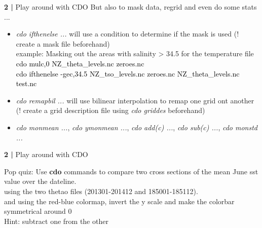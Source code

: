  \begin{frame}{\textbf{2 |} Play around with CDO} 
    But also to mask data, regrid and even do some stats ...\\
        \vspace{0.5cm}
    \begin{itemize}
        \item\textit{cdo ifthenelse ...} will use a condition to determine if the mask is used (! create a mask file beforehand) \\
                \vspace{0.3cm}
            example: Masking out the areas with salinity > 34.5 for the temperature file\\
                \vspace{0.3cm}
            \textcolor{black}{cdo mulc,0 NZ\_theta\_levels.nc zeroes.nc \\
            cdo ifthenelse -gec,34.5 NZ\_tso\_levels.nc zeroes.nc NZ\_theta\_levels.nc  test.nc}\\
                \vspace{0.5cm}
        \item\textit{cdo remapbil ...} will use bilinear interpolation to remap one grid ont another (! create a grid description file using \textit{cdo griddes} beforehand)\\
            \vspace{0.5cm}
        \item \textit{cdo monmean ...}, \textit{cdo ymonmean ...}, \textit{cdo add(c) ...}, \textit{cdo sub(c) ...}, \textit{cdo monstd ...}
    \end{itemize}
\end{frame}


 \begin{frame}{\textbf{2 |} Play around with CDO} 
    \begin{beamerboxesrounded}[lower=gray,shadow=true]{Pop quiz: Use \textbf{cdo} commands to         compare two cross sections of the mean June sst value over the dateline. \\
            \vspace{0.5cm}
        using the two thetao files (201301-201412 and 185001-185112).\\
            \vspace{0.5cm}
        and using the red-blue colormap, invert the y scale and make the colorbar symmetrical around 0\\
            \vspace{2cm}
        Hint: subtract one from the other}
    \end{beamerboxesrounded}
\end{frame}


